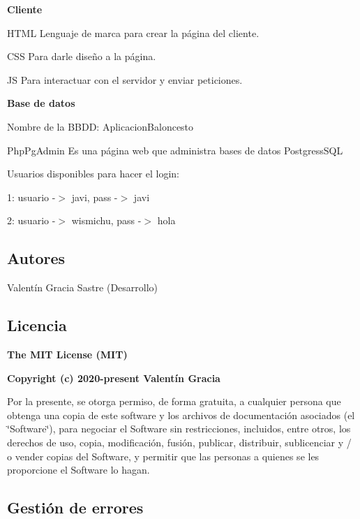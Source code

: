 {\bfseries Cliente}
\begin{DoxyItemize}
\item H\+T\+ML Lenguaje de marca para crear la página del cliente.
\item C\+SS Para darle diseño a la página.
\item JS Para interactuar con el servidor y enviar peticiones.
\end{DoxyItemize}

{\bfseries Base de datos}
\begin{DoxyItemize}
\item Nombre de la B\+B\+DD\+: Aplicacion\+Baloncesto
\item Php\+Pg\+Admin Es una página web que administra bases de datos Postgress\+S\+QL
\item Usuarios disponibles para hacer el login\+:
\item 1\+: usuario -\/$>$ javi, pass -\/$>$ javi
\item 2\+: usuario -\/$>$ wismichu, pass -\/$>$ hola
\end{DoxyItemize}

\subsection*{Autores}


\begin{DoxyItemize}
\item Valentín Gracia Sastre (Desarrollo)
\end{DoxyItemize}

\subsection*{Licencia}

{\bfseries The M\+IT License (M\+IT)}

{\bfseries Copyright (c) 2020-\/present Valentín Gracia}

Por la presente, se otorga permiso, de forma gratuita, a cualquier persona que obtenga una copia de este software y los archivos de documentación asociados (el \char`\"{}\+Software\char`\"{}), para negociar el Software sin restricciones, incluidos, entre otros, los derechos de uso, copia, modificación, fusión, publicar, distribuir, sublicenciar y / o vender copias del Software, y permitir que las personas a quienes se les proporcione el Software lo hagan.

\subsection*{Gestión de errores}


